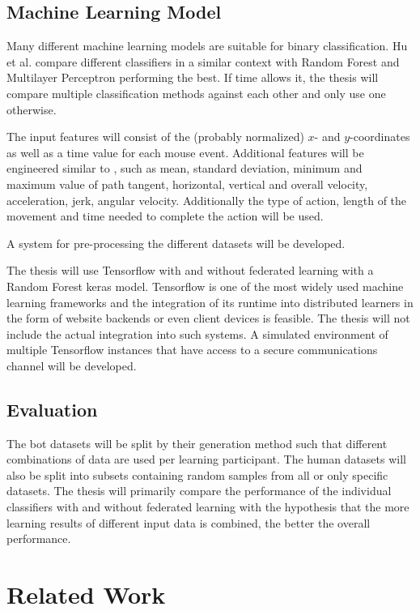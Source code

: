 \documentclass[
    fontsize=12pt,
    headings=small,
    parskip=half,           %
    bibliography=totoc,
    numbers=noenddot,       %
    open=any,               %
    final                   %
    ]{scrreprt}
\begin{document}
\section{Machine Learning Model}

Many different machine learning models are suitable for binary classification. Hu et al. \cite{8275816} compare different classifiers in a similar context with Random Forest and Multilayer Perceptron performing the best. If time allows it, the thesis will compare multiple classification methods against each other and only use one otherwise.

The input features will consist of the (probably normalized) $x$- and $y$-coordinates as well as a time value for each mouse event. Additional features will be engineered similar to \cite{DBLP:journals/corr/abs-1810-04668}, such as mean, standard deviation, minimum and maximum value of path tangent, horizontal, vertical and overall velocity, acceleration, jerk, angular velocity. Additionally the type of action, length of the movement and time needed to complete the action will be used.

A system for pre-processing the different datasets will be developed.

The thesis will use Tensorflow with and without federated learning with a Random Forest keras model. Tensorflow is one of the most widely used machine learning frameworks and the integration of its runtime into distributed learners in the form of website backends or even client devices is feasible. The thesis will not include the actual integration into such systems. A simulated environment of multiple Tensorflow instances that have access to a secure communications channel will be developed.

\section{Evaluation}

The bot datasets will be split by their generation method such that different combinations of data are used per learning participant. The human datasets will also be split into subsets containing random samples from all or only specific datasets. The thesis will primarily compare the performance of the individual classifiers with and without federated learning with the hypothesis that the more learning results of different input data is combined, the better the overall performance.


\chapter{Related Work}
\end{document}
